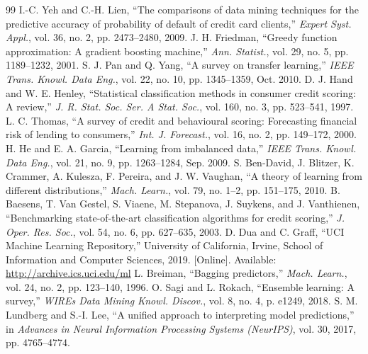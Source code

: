 \documentclass[onecolumn]{IEEEtai}
\begin{document}
\begin{thebibliography}{99}
 I.-C. Yeh and C.-H. Lien, ``The comparisons of data mining techniques for the predictive accuracy of probability of default of credit card clients,'' {\em Expert Syst. Appl.}, vol. 36, no. 2, pp. 2473--2480, 2009.
 J. H. Friedman, ``Greedy function approximation: A gradient boosting machine,'' {\em Ann. Statist.}, vol. 29, no. 5, pp. 1189--1232, 2001.
 S. J. Pan and Q. Yang, ``A survey on transfer learning,'' {\em IEEE Trans. Knowl. Data Eng.}, vol. 22, no. 10, pp. 1345--1359, Oct. 2010.
 D. J. Hand and W. E. Henley, ``Statistical classification methods in consumer credit scoring: A review,'' {\em J. R. Stat. Soc. Ser. A Stat. Soc.}, vol. 160, no. 3, pp. 523--541, 1997.
 L. C. Thomas, ``A survey of credit and behavioural scoring: Forecasting financial risk of lending to consumers,'' {\em Int. J. Forecast.}, vol. 16, no. 2, pp. 149--172, 2000.
 H. He and E. A. Garcia, ``Learning from imbalanced data,'' {\em IEEE Trans. Knowl. Data Eng.}, vol. 21, no. 9, pp. 1263--1284, Sep. 2009.
 S. Ben-David, J. Blitzer, K. Crammer, A. Kulesza, F. Pereira, and J. W. Vaughan, ``A theory of learning from different distributions,'' {\em Mach. Learn.}, vol. 79, no. 1--2, pp. 151--175, 2010.
 B. Baesens, T. Van Gestel, S. Viaene, M. Stepanova, J. Suykens, and J. Vanthienen, ``Benchmarking state-of-the-art classification algorithms for credit scoring,'' {\em J. Oper. Res. Soc.}, vol. 54, no. 6, pp. 627--635, 2003.
 D. Dua and C. Graff, ``UCI Machine Learning Repository,'' University of California, Irvine, School of Information and Computer Sciences, 2019. [Online]. Available: \url{http://archive.ics.uci.edu/ml}
 L. Breiman, ``Bagging predictors,'' {\em Mach. Learn.}, vol. 24, no. 2, pp. 123--140, 1996.
 O. Sagi and L. Rokach, ``Ensemble learning: A survey,'' {\em WIREs Data Mining Knowl. Discov.}, vol. 8, no. 4, p. e1249, 2018.
 S. M. Lundberg and S.-I. Lee, ``A unified approach to interpreting model predictions,'' in {\em Advances in Neural Information Processing Systems (NeurIPS)}, vol. 30, 2017, pp. 4765--4774.
\end{thebibliography}

\end{document}
